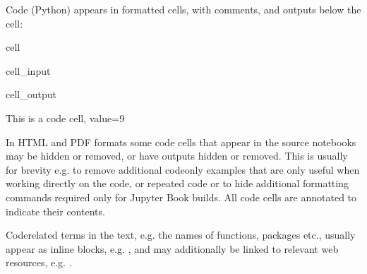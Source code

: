 \documentclass[letterpaper,table,10pt,english]{jupyterBook}
\begin{document}
\sphinxAtStartPar
Code (Python) appears in formatted cells, with comments, and outputs below the cell:

\begin{sphinxuseclass}{cell}\begin{sphinxVerbatimInput}

\begin{sphinxuseclass}{cell_input}
\begin{sphinxVerbatim}[commandchars=\\\{\}]
  
\end{sphinxVerbatim}

\end{sphinxuseclass}\end{sphinxVerbatimInput}
\begin{sphinxVerbatimOutput}

\begin{sphinxuseclass}{cell_output}
\begin{sphinxVerbatim}[commandchars=\\\{\}]
This is a code cell, value=9
\end{sphinxVerbatim}

\end{sphinxuseclass}\end{sphinxVerbatimOutput}

\end{sphinxuseclass}
\sphinxAtStartPar
In HTML and PDF formats some code cells that appear in the source notebooks may be hidden or removed, or have outputs hidden or removed. This is usually for brevity \sphinxhyphen{} e.g. to remove additional code\sphinxhyphen{}only examples that are only useful when working directly on the code, or repeated code \sphinxhyphen{} or to hide additional formatting commands required only for Jupyter Book builds. All code cells are annotated to indicate their contents.

\sphinxAtStartPar
Code\sphinxhyphen{}related terms in the text, e.g. the names of functions, packages etc., usually appear as in\sphinxhyphen{}line blocks, e.g. , and may additionally be linked to relevant web resources, e.g. .
\end{document}
